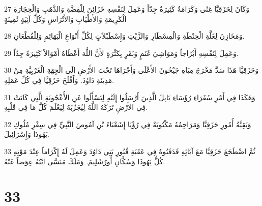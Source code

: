 \par 27 وَكَانَ لِحَزَقِيَّا غِنًى وَكَرَامَةٌ كَثِيرَةٌ جِدّاً وَعَمِلَ لِنَفْسِهِ خَزَائِنَ لِلْفِضَّةِ وَالذَّهَبِ وَالْحِجَارَةِ الْكَرِيمَةِ وَالأَطْيَابِ وَالأَتْرَاسِ وَكُلِّ آنِيَةٍ ثَمِينَةٍ
\par 28 وَمَخَازِنَ لِغَلَّةِ الْحِنْطَةِ وَالْمِسْطَارِ وَالزَّيْتِ وَإِسْطَبْلاَتٍ لِكُلِّ أَنْوَاعِ الْبَهَائِمِ وَلِلْقُطْعَانِ.
\par 29 وَعَمِلَ لِنَفْسِهِ أَبْرَاجاً وَمَوَاشِيَ غَنَمٍ وَبَقَرٍ بِكَثْرَةٍ لأَنَّ اللَّهَ أَعْطَاهُ أَمْوَالاً كَثِيرَةً جِدّاً.
\par 30 وَحَزَقِيَّا هَذَا سَدَّ مَخْرَجَ مِيَاهِ جَيْحُونَ الأَعْلَى وَأَجْرَاهَا تَحْتَ الأَرْضِ إِلَى الْجِهَةِ الْغَرْبِيَّةِ مِنْ مَدِينَةِ دَاوُدَ. وَأَفْلَحَ حَزَقِيَّا فِي كُلِّ عَمَلِهِ.
\par 31 وَهَكَذَا فِي أَمْرِ سُفَرَاءِ رُؤَسَاءِ بَابِلَ الَّذِينَ أَرْسَلُوا إِلَيْهِ لِيَسْأَلُوا عَنِ الأُعْجُوبَةِ الَّتِي كَانَتْ فِي الأَرْضِ تَرَكَهُ اللَّهُ لِيُجَرِّبَهُ لِيَعْلَمَ كُلَّ مَا فِي قَلْبِهِ.
\par 32 وَبَقِيَّةُ أُمُورِ حَزَقِيَّا وَمَرَاحِمُهُ مَكْتُوبَةٌ فِي رُؤْيَا إِشَعْيَاءَ بْنِ آمُوصَ النَّبِيِّ فِي سِفْرِ مُلُوكِ يَهُوذَا وَإِسْرَائِيلَ.
\par 33 ثُمَّ اضْطَجَعَ حَزَقِيَّا مَعَ آبَائِهِ فَدَفَنُوهُ فِي عَقَبَةِ قُبُورِ بَنِي دَاوُدَ وَعَمِلَ لَهُ إِكْرَاماً عِنْدَ مَوْتِهِ كُلُّ يَهُوذَا وَسُكَّانِ أُورُشَلِيمَ. وَمَلَكَ مَنَسَّى ابْنُهُ عِوَضاً عَنْهُ.

\chapter{33}

